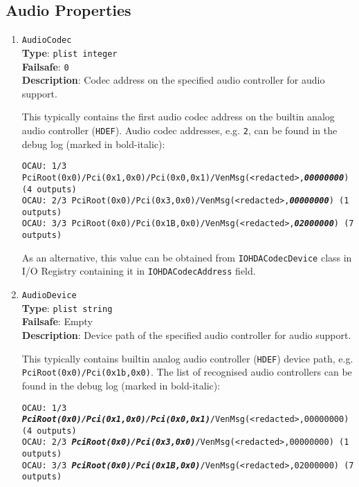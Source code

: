 \documentclass[]{article}
\begin{document}
\subsection{Audio Properties}\label{uefiaudioprops}

\begin{enumerate}

\item
  \texttt{AudioCodec}\\
  \textbf{Type}: \texttt{plist\ integer}\\
  \textbf{Failsafe}: \texttt{0}\\
  \textbf{Description}: Codec address on the specified audio controller for audio support.

  This typically contains the first audio codec address on the builtin analog audio controller (\texttt{HDEF}).
  Audio codec addresses, e.g. \texttt{2}, can be found in the debug log (marked in bold-italic):

  \texttt{OCAU: 1/3 PciRoot(0x0)/Pci(0x1,0x0)/Pci(0x0,0x1)/VenMsg(<redacted>,\textit{\textbf{00000000}}) (4 outputs)}\\
  \texttt{OCAU: 2/3 PciRoot(0x0)/Pci(0x3,0x0)/VenMsg(<redacted>,\textit{\textbf{00000000}}) (1 outputs)}\\
  \texttt{OCAU: 3/3 PciRoot(0x0)/Pci(0x1B,0x0)/VenMsg(<redacted>,\textit{\textbf{02000000}}) (7 outputs)}

  As an alternative, this value can be obtained from \texttt{IOHDACodecDevice} class in I/O Registry
  containing it in \texttt{IOHDACodecAddress} field.

\item
  \texttt{AudioDevice}\\
  \textbf{Type}: \texttt{plist\ string}\\
  \textbf{Failsafe}: Empty\\
  \textbf{Description}: Device path of the specified audio controller for audio support.

  This typically contains builtin analog audio controller (\texttt{HDEF}) device path,
  e.g. \texttt{PciRoot(0x0)/Pci(0x1b,0x0)}. The list of recognised audio controllers can be
  found in the debug log (marked in bold-italic):

  \texttt{OCAU: 1/3 \textit{\textbf{PciRoot(0x0)/Pci(0x1,0x0)/Pci(0x0,0x1)}}/VenMsg(<redacted>,00000000) (4 outputs)}\\
  \texttt{OCAU: 2/3 \textit{\textbf{PciRoot(0x0)/Pci(0x3,0x0)}}/VenMsg(<redacted>,00000000) (1 outputs)}\\
  \texttt{OCAU: 3/3 \textit{\textbf{PciRoot(0x0)/Pci(0x1B,0x0)}}/VenMsg(<redacted>,02000000) (7 outputs)}


\end{enumerate}
\end{document}
